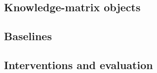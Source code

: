 \subsection*{Knowledge-matrix objects}





\subsection*{Baselines}






\subsection*{Interventions and evaluation}



\endgroup

